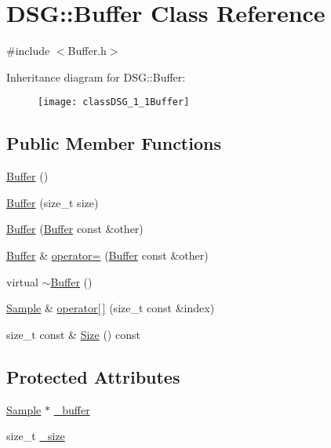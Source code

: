 \hypertarget{classDSG_1_1Buffer}{\section{D\+S\+G\+:\+:Buffer Class Reference}
\label{classDSG_1_1Buffer}
}


{\ttfamily \#include $<$Buffer.\+h$>$}

Inheritance diagram for D\+S\+G\+:\+:Buffer\+:\begin{figure}[H]
\begin{center}
\leavevmode
\texttt{[image: classDSG\_1\_1Buffer]}
\end{center}
\end{figure}
\subsection*{Public Member Functions}
\begin{DoxyCompactItemize}
\item 
\hyperlink{classDSG_1_1Buffer_aa764dd8c389dcff51de08cb81fafeb86}{Buffer} ()
\item 
\hyperlink{classDSG_1_1Buffer_a0e6502fd61833043744f9df94e8d5111}{Buffer} (size\+\_\+t size)
\item 
\hyperlink{classDSG_1_1Buffer_a468a65d70553dfb773e4592b4b077683}{Buffer} (\hyperlink{classDSG_1_1Buffer}{Buffer} const \&other)
\item 
\hyperlink{classDSG_1_1Buffer}{Buffer} \& \hyperlink{classDSG_1_1Buffer_a977d572a7d402ff6bf991d7c5c0cc6a7}{operator=} (\hyperlink{classDSG_1_1Buffer}{Buffer} const \&other)
\item 
virtual \hyperlink{classDSG_1_1Buffer_a619fc41bf263a419da1a19254e194101}{$\sim$\+Buffer} ()
\item 
\hyperlink{classDSG_1_1Sample}{Sample} \& \hyperlink{classDSG_1_1Buffer_a5dafe5522f3d20756f83e08499e8eaeb}{operator\mbox{[}$\,$\mbox{]}} (size\+\_\+t const \&index)
\item 
size\+\_\+t const \& \hyperlink{classDSG_1_1Buffer_a4acea659d9cd0be652ec55d21e5b0262}{Size} () const 
\end{DoxyCompactItemize}
\subsection*{Protected Attributes}
\begin{DoxyCompactItemize}
\item 
\hyperlink{classDSG_1_1Sample}{Sample} $\ast$ \hyperlink{classDSG_1_1Buffer_a6506d4763401650acb463cb5d4913e31}{\+\_\+buffer}
\item 
size\+\_\+t \hyperlink{classDSG_1_1Buffer_a4e2fef9ed617af2554b25c999def8f71}{\+\_\+size}
\end{DoxyCompactItemize}


